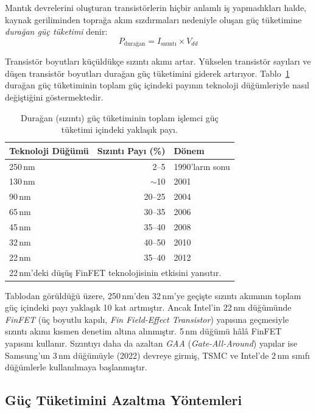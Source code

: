 Mantık devrelerini oluşturan transistörlerin hiçbir anlamlı iş yapmadıkları halde, kaynak geriliminden toprağa akım sızdırmaları nedeniyle oluşan güç tüketimine \emph{durağan güç tüketimi} denir:
\begin{equation}
P_{\text{durağan}} = I_{\text{sızıntı}} \times V_{dd}
\label{eq:duragan-guc}
\end{equation}

Transistör boyutları küçüldükçe sızıntı akımı artar. Yükselen transistör sayıları ve düşen transistör boyutları durağan güç tüketimini giderek artırıyor. Tablo~\ref{tab:sizinti-trend} durağan güç tüketiminin toplam güç içindeki payının teknoloji düğümleriyle nasıl değiştiğini göstermektedir.

\begin{table}[ht!]
\centering
\caption[Durağan güç oranının teknoloji düğümlerine göre değişimi]{Durağan (sızıntı) güç tüketiminin toplam işlemci güç tüketimi içindeki yaklaşık payı.}
\label{tab:sizinti-trend}
\footnotesize
\begin{tabular}{lrl}
\toprule
\textbf{Teknoloji Düğümü} & \textbf{Sızıntı Payı (\%)} & \textbf{Dönem} \\
\midrule
250\,nm  & 2--5    & 1990'ların sonu \\
130\,nm  & ${\sim}$10   & 2001 \\
90\,nm   & 20--25  & 2004 \\
65\,nm   & 30--35  & 2006 \\
45\,nm   & 35--40  & 2008 \\
32\,nm   & 40--50  & 2010 \\
22\,nm   & 35--40  & 2012 \\
\bottomrule
\multicolumn{3}{l}{\scriptsize 22\,nm'deki düşüş FinFET teknolojisinin etkisini yansıtır.}
\end{tabular}
\end{table}

Tablodan görüldüğü üzere, 250\,nm'den 32\,nm'ye geçişte sızıntı akımının toplam güç içindeki payı yaklaşık 10 kat artmıştır. Ancak Intel'in 22\,nm düğümünde \emph{FinFET} (üç boyutlu kapılı, \emph{Fin Field-Effect Transistor}) yapısına geçmesiyle sızıntı akımı kısmen denetim altına alınmıştır. 5\,nm düğümü hâlâ FinFET yapısını kullanır. Sızıntıyı daha da azaltan \emph{GAA} (\emph{Gate-All-Around}) yapılar ise Samsung'un 3\,nm düğümüyle (2022) devreye girmiş, TSMC ve Intel'de 2\,nm sınıfı düğümlerle kullanılmaya başlanmıştır.


\subsection{Güç Tüketimini Azaltma Yöntemleri}
\label{sec:guc-azaltma}

